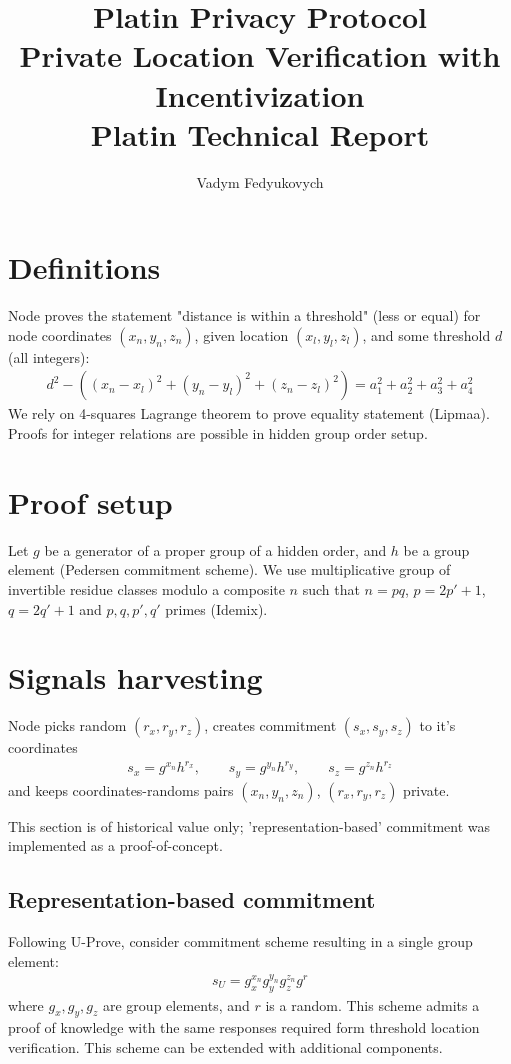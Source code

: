 \documentclass[a4paper,12pt]{article}
\author{
  \small{
  Vadym Fedyukovych
  }
}
\title{Platin Privacy Protocol \\
\small{
  Private Location Verification with Incentivization
} \\
\large{
  Platin Technical Report
}
}
\begin{document}
\maketitle
{}

\section{Definitions}
\label{sect-definitions}
Node proves the statement "distance is within a threshold" (less or equal)
for node coordinates $(x_n, y_n, z_n)$,
given location $(x_l, y_l, z_l)$,
and some threshold $d$ (all integers):
\begin{gather}
\label{eq-distn}
  d^2 - ((x_n - x_l)^2 + (y_n - y_l)^2 + (z_n - z_l)^2) = a_1^2 + a_2^2 + a_3^2 + a_4^2
\end{gather}
We rely on 4-squares Lagrange theorem to prove equality statement (Lipmaa).
Proofs for integer relations are possible in hidden group order setup.

\section{Proof setup}

Let $g$ be a generator of a proper group of a hidden order,
and $h$ be a group element (Pedersen commitment scheme).
We use multiplicative group of invertible residue classes modulo a composite $n$ such that
$n=pq$, $p=2p'+1$, $q=2q'+1$ and $p, q, p', q'$ primes (Idemix).

\section{Signals harvesting}
Node picks random $(r_x, r_y, r_z)$, creates commitment $(s_x, s_y, s_z)$ to it's coordinates
\begin{gather}
\label{cmt-pedr}
  s_x = g^{x_n} h^{r_x},   \qquad
  s_y = g^{y_n} h^{r_y},   \qquad
  s_z = g^{z_n} h^{r_z}
\end{gather}
and keeps coordinates-randoms pairs
$(x_n, y_n, z_n)$, $(r_x, r_y, r_z)$
private.

This section is of historical value only;
'representation-based' commitment was implemented as a proof-of-concept.

\subsection{Representation-based commitment}
Following U-Prove, consider commitment scheme resulting in a single group element:
\begin{gather}
\label{cmt-up}
  s_U = g_x^{x_n} g_y^{y_n} g_z^{z_n} g^{r}
\end{gather}
where $g_x, g_y, g_z$ are group elements, and $r$ is a random.
This scheme admits a proof of knowledge with the same responses required form threshold location verification.
This scheme can be extended with additional components. %
\end{document}
